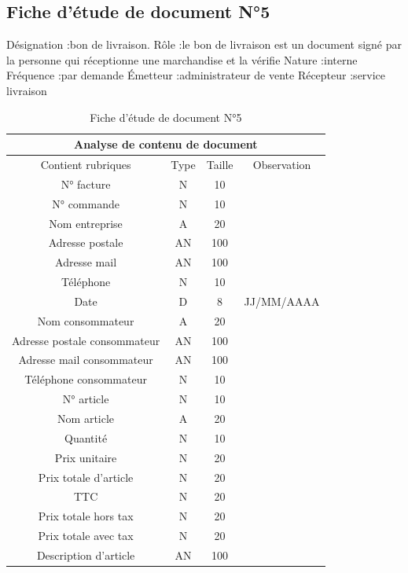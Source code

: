 \documentclass[edit,12pt,a4paper,ChapStyle,oneside,doubleinterligne]{report}
\begin{document}
\newpage
\subsection{Fiche d’étude de document N°5}
Désignation :bon de livraison.
\newline Rôle :le bon de livraison est un document signé par la personne qui réceptionne une marchandise et la vérifie
\newline Nature :interne
\newline Fréquence :par demande
\newline Émetteur :administrateur de vente
\newline Récepteur :service livraison \cite{bonl}
\begin{table}[h!]
    \centering
    \begin{tabular}{|c|c|c|c|}
         \hline
\multicolumn{4}{|c|}{Analyse de contenu de document}\\
\hline
Contient rubriques & Type & Taille & Observation\\
\hline
 N° facture  & N & 10 & \\
 N° commande  & N & 10 & \\
 Nom entreprise & A & 20 & \\
 Adresse postale & AN & 100 & \\
 Adresse mail & AN & 100 & \\
 Téléphone & N & 10 & \\
Date & D & 8 & JJ/MM/AAAA \\
Nom consommateur & A & 20 & \\
Adresse postale consommateur & AN & 100 & \\
Adresse mail consommateur & AN & 100 & \\
Téléphone consommateur & N & 10 & \\
N° article & N & 10 & \\
Nom article & A & 20 & \\
Quantité & N & 10 & \\
Prix unitaire & N & 20 & \\
Prix totale d’article & N & 20 & \\
TTC & N & 20 & \\
Prix totale hors tax & N & 20 & \\
Prix totale avec tax & N & 20 & \\
Description d’article & AN & 100 & \\
\hline
    \end{tabular}
    \caption{Fiche d’étude de document N°5}
    \label{tab:5}
\end{table}
\end{document}
